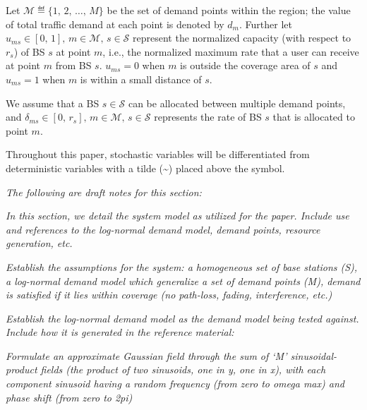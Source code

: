 \documentclass[onecolumn,draftcls]{IEEEtran}
\begin{document}
Let $ \mathcal{M} \eqdef \{1,\, 2,\, \ldots,\, M\} $ be the set of demand points within the region; the value of total traffic demand at each point is denoted by $d_m$.  Further let $ u_{ms} \in [0,\, 1],\, m \in \mathcal{M},\, s \in \mathcal{S} $ represent the normalized capacity (with respect to $r_s$) of BS $s$ at point $m$, i.e., the normalized maximum rate that a user can receive at point $m$ from BS $s$.  $u_{ms} = 0$ when $m$ is outside the coverage area of $s$ and $u_{ms} = 1$ when $m$ is within a small distance of $s$.%


We assume that a BS $s \in \mathcal{S}$ can be allocated between multiple demand points, and $\delta_{ms} \in [0,\, r_s],\, m \in \mathcal{M},\, s \in \mathcal{S}$ represents the rate of BS $s$ that is allocated to point $m$.

Throughout this paper, stochastic variables will be differentiated from deterministic variables with a tilde (\textasciitilde) placed above the symbol.

\iffalse
\noindent {\color{red} \rule{\linewidth}{0.5mm}}

\textit{The following are draft notes for this section:}

\textit{In this section, we detail the system model as utilized for the paper.  Include use and references to the log-normal demand model, demand points, resource generation, etc.}

\textit{Establish the assumptions for the system: a homogeneous set of base stations (S), a log-normal demand model which generalize a set of demand points (M), demand is satisfied if it lies within coverage (no path-loss, fading, interference, etc.)}

\textit{Establish the log-normal demand model as the demand model being tested against.  Include how it is generated in the reference material:}

\textit{Formulate an approximate Gaussian field through the sum of `M' sinusoidal-product fields (the product of two sinusoids, one in y, one in x), with each component sinusoid having a random frequency (from zero to omega max) and phase shift (from zero to 2pi)}
		
\end{document}
